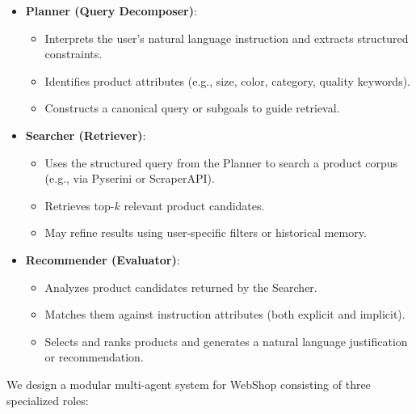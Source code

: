 \begin{itemize}
    \item \textbf{Planner (Query Decomposer)}:
    \begin{itemize}
        \item Interprets the user's natural language instruction and extracts structured constraints.
        \item Identifies product attributes (e.g., size, color, category, quality keywords).
        \item Constructs a canonical query or subgoals to guide retrieval.
    \end{itemize}

    \item \textbf{Searcher (Retriever)}:
    \begin{itemize}
        \item Uses the structured query from the Planner to search a product corpus (e.g., via Pyserini or ScraperAPI).
        \item Retrieves top-$k$ relevant product candidates.
        \item May refine results using user-specific filters or historical memory.
    \end{itemize}

    \item \textbf{Recommender (Evaluator)}:
    \begin{itemize}
        \item Analyzes product candidates returned by the Searcher.
        \item Matches them against instruction attributes (both explicit and implicit).
        \item Selects and ranks products and generates a natural language justification or recommendation.
    \end{itemize}
\end{itemize}

We design a modular multi-agent system for WebShop consisting of three specialized roles:


